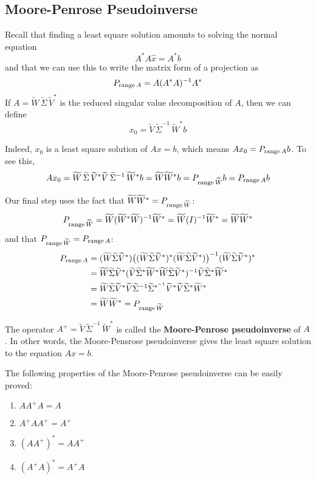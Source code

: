 \subsection{Moore-Penrose Pseudoinverse}

Recall that finding a least square solution amounts to solving the normal equation 
$$A^{*} A \hat{x} = A^{*} b$$
and that we can use this to write the matrix form of a projection as 
$$P_{\operatorname{range} A} = A(A^{*} A)^{-1} A^{*}$$
If $A = \widetilde{W} \, \widetilde{\Sigma} \, \widetilde{V}^{*}$ is the reduced singular value decomposition of $A$, then we can define 
$$ x_{0} = \widetilde{V} \, \widetilde{\Sigma}^{-1} \, \widetilde{W}^{*} b$$

Indeed, $x_{0}$ is a least square solution of $Ax = b$, which means $Ax_{0} = P_{\operatorname{range} A} b$. To see this, 
$$Ax_{0} = \widetilde{W} \, \widetilde{\Sigma} \, \widetilde{V}^{*} \widetilde{V} \, \widetilde{\Sigma}^{-1} \, \widetilde{W}^{*} b = \widetilde{W} \widetilde{W}^{*} b = P_{\operatorname{range} \widetilde{W}} b = P_{\operatorname{range} A} b $$

Our final step uses the fact that $\widetilde{W} \widetilde{W}^{*} = P_{\operatorname{range} \widetilde{W}}$: 
$$P_{\operatorname{range} \widetilde{W}} = \widetilde{W} (\widetilde{W}^{*} \widetilde{W})^{-1} \widetilde{W}^{*} = \widetilde{W} (I)^{-1} \widetilde{W}^{*} = \widetilde{W} \widetilde{W}^{*}$$
and that $P_{\operatorname{range} \widetilde{W}} = P_{\operatorname{range} A}$:
$$
\begin{aligned}
P_{\operatorname{range} A} &= (\widetilde{W} \widetilde{\Sigma} \widetilde{V}^{*}) \big( (\widetilde{W} \widetilde{\Sigma} \widetilde{V}^{*})^{*} (\widetilde{W} \widetilde{\Sigma} \widetilde{V}^{*}) \big)^{-1} (\widetilde{W} \widetilde{\Sigma} \widetilde{V}^{*})^{*} \\
&= \widetilde{W} \widetilde{\Sigma} \widetilde{V}^{*} ( \widetilde{V} \widetilde{\Sigma}^{*} \widetilde{W}^{*} \widetilde{W} \widetilde{\Sigma} \widetilde{V}^{*} )^{-1} \widetilde{V} \widetilde{\Sigma}^{*} \widetilde{W}^{*} \\
&= \widetilde{W} \widetilde{\Sigma} \widetilde{V}^{*} \widetilde{V} \widetilde{\Sigma}^{-1} \widetilde{\Sigma}^{*^{-1}} \widetilde{V}^{*}  \widetilde{V} \widetilde{\Sigma}^{*} \widetilde{W}^{*} \\
&= \widetilde{W} \widetilde{W}^{*} = P_{\operatorname{range} \widetilde{W}}
\end{aligned}
$$

\begin{definition}
The operator $A^{+} = \widetilde{V} \, \widetilde{\Sigma}^{-1} \, \widetilde{W}^{*} $ is called the \textbf{Moore-Penrose pseudoinverse} of $A$. In other words, the Moore-Pensrose pseudoinverse gives the least square solution to the equation $Ax = b$. 

The following properties of the Moore-Penrose pseudoinverse can be easily proved: 
\begin{enumerate}
	\item $AA^{+}A = A$
	\item $A^{+} A A^{+} = A^{+}$
	\item $(AA^{+})^{*} = AA^{+}$
	\item $(A^{+} A)^{*} = A^{+} A$
\end{enumerate}
\end{definition}

